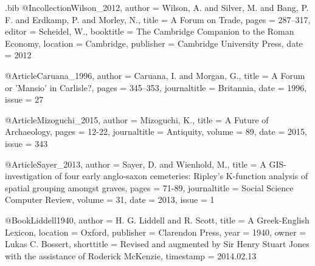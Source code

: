 \begin{filecontents}{\identifier.bib}
@Incollection{Wilson_2012,
  author =    {Wilson, A. and Silver, M. and Bang, P. F. and Erdkamp, P. and Morley, N.},
  title =     {A Forum on Trade},
  pages =     {287--317},
  editor =    {Scheidel, W.},
  booktitle = {The Cambridge Companion to the Roman Economy},
  location =  {Cambridge},
  publisher = {Cambridge University Press},
  date =      {2012}
}

@Article{Caruana_1996,
  author =       {Caruana, I. and Morgan, G.},
  title =        {A Forum or 'Mansio' in Carlisle?},
  pages =        {345–353},
  journaltitle = {Britannia},
  date =         {1996},
  issue =        {27}
}

@Article{Mizoguchi_2015,
  author =       {Mizoguchi, K.},
  title =        {A Future of Archaeology},
  pages =        {12-22},
  journaltitle = {Antiquity},
  volume =       {89},
  date =         {2015},
  issue =        {343}
}

@Article{Sayer_2013,
  author =       {Sayer, D. and Wienhold, M.},
  title =        {A GIS-investigation of four early anglo-saxon cemeteries: Ripley’s K-function analysis of spatial grouping amongst graves},
  pages =        {71-89},
  journaltitle = {Social Science Computer Review},
  volume =       {31},
  date =         {2013},
  issue =        {1}
}

@Book{Liddell1940,
  author =     {H. G. Liddell and R. Scott},
  title =      {A Greek-English Lexicon},
  location =   {Oxford},
  publisher =  {Clarendon Press},
  year =       {1940},
  owner =      {Lukas C. Bossert},
  shorttitle = {Revised and augmented by Sir Henry Stuart Jones with the assistance of Roderick McKenzie},
  timestamp =  {2014.02.13}
}


\end{filecontents}
